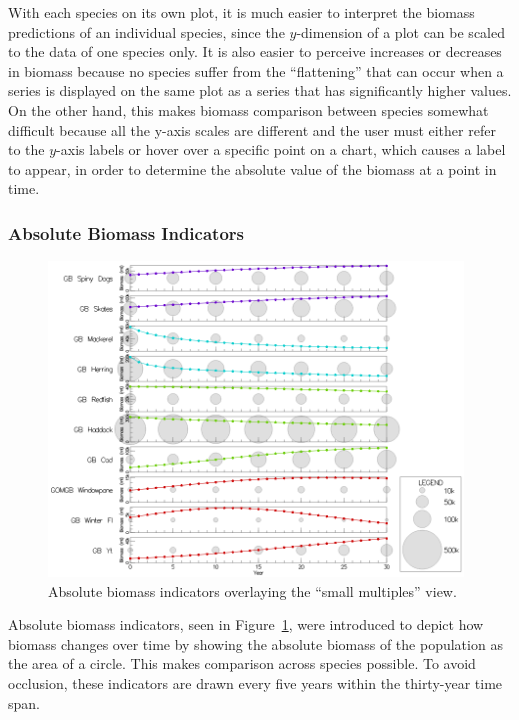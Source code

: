 With each species on its own plot, it is much easier to interpret the biomass predictions of an individual species, since the $y$-dimension of a plot can be scaled to the data of one species only.  It is also easier to perceive increases or decreases in biomass because no species suffer from the ``flattening'' that can occur when a series is displayed on the same plot as a series that has significantly higher values.  On the other hand, this makes biomass comparison between species somewhat difficult because all the y-axis scales are different and the user must either refer to the $y$-axis labels or hover over a specific point on a chart, which causes a label to appear, in order to determine the absolute value of the biomass at a point in time.

\subsubsection{Absolute Biomass Indicators}

\begin{figure}[h]
	\centering
	\includegraphics[width=11cm]{figures/png/msprod_abssize.png}
	\caption[Absolute biomass indicators overlaying the ``small multiples'' view]{Absolute biomass indicators overlaying the ``small multiples'' view.}
	\label{fig:msprod_abssize}
\end{figure}

Absolute biomass indicators, seen in Figure~\ref{fig:msprod_abssize}, were introduced to depict how biomass changes over time by showing the absolute biomass of the population as the area of a circle.  This makes comparison across species possible.  To avoid occlusion, these indicators are drawn every five years within the thirty-year time span.

